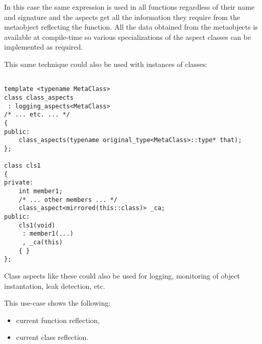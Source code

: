In this case the same expression is used in all functions
regardless of their name and signature and the aspects get all the information
they require from the metaobject reflecting the function. All the data
obtained from the metaobjects is available at compile-time so various
specializations of the aspect classes can be implemented as required.

This same technique could also be used with instances of classes:

\begin{verbatim}

template <typename MetaClass>
class class_aspects
 : logging_aspects<MetaClass>
/* ... etc. ... */
{
public:
	class_aspects(typename original_type<MetaClass>::type* that);
};

class cls1
{
private:
	int member1;
	/* ... other members ... */
	class_aspect<mirrored(this::class)> _ca;
public:
	cls1(void)
	 : member1(...)
	 , _ca(this)
	{ }
};

\end{verbatim}

Class aspects like these could also be used for logging, monitoring of object instantation,
leak detection, etc.

This use-case shows the following:

\begin{itemize}
\item{current function reflection,}
\item{current class reflection.}
\end{itemize}

